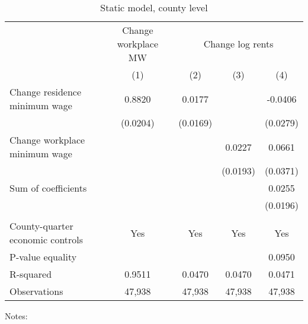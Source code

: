 \begin{table}[hbt!] \centering
    \caption{Static model, county level}
    \label{tab:static_county}

    \begin{tabular}{l*{4}{c}}
    \toprule
                                        & \multicolumn{1}{c}{Change workplace MW}
                                        & \multicolumn{3}{c}{Change log rents}  \\ \cmidrule(lr){2-2}\cmidrule(lr){3-5}
                                              & (1)   & (2)   & (3)   & (4)      \\ \midrule
    Change residence minimum wage             &  0.8820  &  0.0177  &       &  -0.0406     \\
                                              & (0.0204) & (0.0169) &       & (0.0279)    \\
    Change workplace minimum wage             &       &       &  0.0227  & 0.0661      \\
                                              &       &       & (0.0193) & (0.0371)    \\ \midrule
    Sum of coefficients                       &       &       &       &  0.0255     \\
                                              &       &       &       & (0.0196)    \\
                                              &       &       &       &          \\ \midrule
    County-quarter economic controls          &  Yes  & Yes   & Yes   & Yes      \\
    P-value equality                          &       &       &       & 0.0950      \\
    R-squared                                 &  0.9511  &  0.0470  &  0.0470  & 0.0471      \\
    Observations                              & 47,938  & 47,938  & 47,938  & 47,938     \\\bottomrule
    \end{tabular}

    \begin{minipage}{.95\textwidth} \footnotesize
        \vspace{2mm}
        Notes: 
    \end{minipage}
\end{table}
